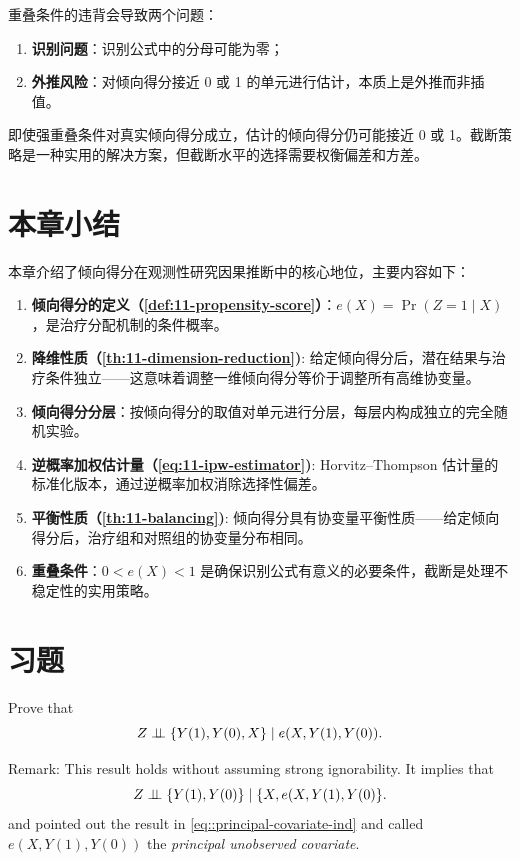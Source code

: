 重叠条件的违背会导致两个问题：
\begin{enumerate}
  \item \textbf{识别问题}：识别公式中的分母可能为零；
  \item \textbf{外推风险}：对倾向得分接近 0 或 1 的单元进行估计，本质上是外推而非插值。
\end{enumerate}

即使强重叠条件对真实倾向得分成立，估计的倾向得分仍可能接近 0 或 1。截断策略是一种实用的解决方案，但截断水平的选择需要权衡偏差和方差。

\section{本章小结}\label{sec:11-summary}

本章介绍了倾向得分在观测性研究因果推断中的核心地位，主要内容如下：

\begin{enumerate}
  \item \textbf{倾向得分的定义（\cref{def:11-propensity-score}）}：$e(X) = \Pr(Z=1 \mid X)$，是治疗分配机制的条件概率。
  \item \textbf{降维性质（\cref{th:11-dimension-reduction})}: 给定倾向得分后，潜在结果与治疗条件独立——这意味着调整一维倾向得分等价于调整所有高维协变量。
  \item \textbf{倾向得分分层}：按倾向得分的取值对单元进行分层，每层内构成独立的完全随机实验。
  \item \textbf{逆概率加权估计量（\cref{eq:11-ipw-estimator})}: Horvitz--Thompson 估计量的标准化版本，通过逆概率加权消除选择性偏差。
  \item \textbf{平衡性质（\cref{th:11-balancing})}: 倾向得分具有协变量平衡性质——给定倾向得分后，治疗组和对照组的协变量分布相同。
  \item \textbf{重叠条件}：$0 < e(X) < 1$ 是确保识别公式有意义的必要条件，截断是处理不稳定性的实用策略。
\end{enumerate}

\section{习题}\label{sec:11-homework}

\begin{HomeworkProblem}\label{exr:11-1}
 Prove that
\begin{equation}
 Z\mathrel{\perp\!\!\!\perp} \{  Y(1), Y(0) , X\}  \mid e(X, Y(1), Y(0)   ) .
\end{equation}

 Remark:
 This result holds without assuming strong ignorability. It implies that
 \[
  Z\mathrel{\perp\!\!\!\perp} \{  Y(1), Y(0) \}  \mid  \{ X,   e(X, Y(1), Y(0)  \} .
 \]
\citet{rosenbaum2020modern} and \citet{rosenbaum2023propensity} pointed out the result in \eqref{eq::principal-covariate-ind} and called $e(X, Y(1), Y(0)   ) $ the  {\it  principal unobserved covariate}.



\end{HomeworkProblem}

